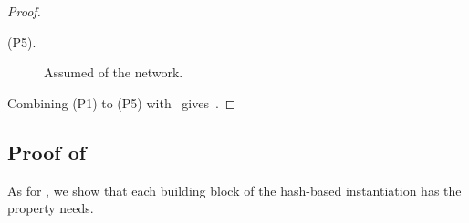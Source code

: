 \begin{proof}
\begin{description}
  \item[(P5).] Assumed of the network.

\end{description}

Combining (P1) to (P5) with~ gives~.

\end{proof}

\subsection{Proof of }\label{sec:txid-hash-inst-sec}

As for , we show that each building block of the hash-based
instantiation has the property  needs.

